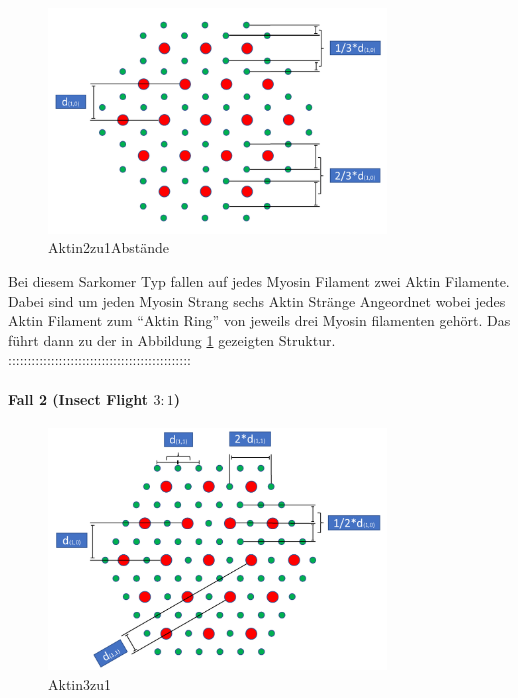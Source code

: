 \documentclass[a4paper,m]{cgBA}
\begin{document}
\begin{figure}[h]
\center
\includegraphics[width=0.8\textwidth]{Graphics/Actin2zu1Abstaende.pdf}
\caption{Aktin2zu1Abstände}
\label{fig:Aktin2zu1}
\end{figure}

Bei diesem Sarkomer Typ fallen auf jedes Myosin Filament zwei Aktin Filamente. Dabei sind um jeden Myosin Strang sechs Aktin Stränge Angeordnet wobei jedes Aktin Filament zum ``Aktin Ring''  von jeweils drei Myosin filamenten gehört. Das führt dann zu der in Abbildung \ref{fig:Aktin2zu1} gezeigten Struktur.
:::::::::::::::::::::::::::::::::::::::::::::::

\paragraph{Fall 2 (Insect Flight \(3:1\))}

\begin{figure}[h]
\center
\includegraphics[width=0.8\textwidth]{Graphics/Actin3zu1Abstaende.pdf}
\caption{Aktin3zu1}
\label{fig:Aktin3zu1}
\end{figure}
\end{document}
